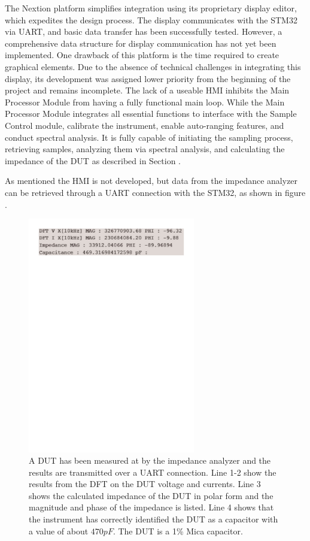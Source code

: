 The Nextion platform simplifies integration using its proprietary display editor, which expedites the design process. The display communicates with the STM32 via UART, and basic data transfer has been successfully tested. However, a comprehensive data structure for display communication has not yet been implemented. One drawback of this platform is the time required to create graphical elements. Due to the absence of technical challenges in integrating this display, its development was assigned lower priority from the beginning of the project and remains incomplete. The lack of a useable HMI inhibits the Main Processor Module from having a fully functional main loop. While the Main Processor Module integrates all essential functions to interface with the Sample Control module, calibrate the instrument, enable auto-ranging features, and conduct spectral analysis. It is fully capable of initiating the sampling process, retrieving samples, analyzing them via spectral analysis, and calculating the impedance of the DUT as described in Section .

As mentioned the HMI is not developed, but data from the impedance analyzer can be retrieved through a UART connection with the STM32, as shown in figure .

\begin{figure}[H] \centering \includegraphics[clip, trim=0 700 0 0, width=0.65\textwidth]{Sections/7_SystemDesign/Figures/7_3_3_CapMeasuredSerialPrint.pdf} \caption{A DUT has been measured at  by the impedance analyzer and the results are transmitted over a UART connection. Line 1-2 show the results from the DFT on the DUT voltage and currents. Line 3 shows the calculated impedance of the DUT in polar form and the magnitude and phase of the impedance is listed. Line 4 shows that the instrument has correctly identified the DUT as a capacitor with a value of about $470pF$. The DUT is a  1\% Mica capacitor.} \label{fig:7_3_3_CapMeasSerialPrint} \end{figure}

